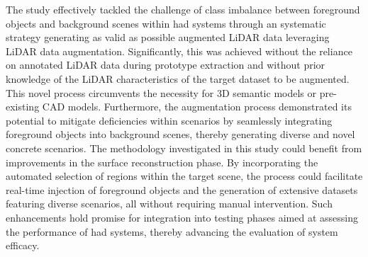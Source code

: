 The study effectively tackled the challenge of class imbalance between foreground objects and background scenes within \acrfull{had} systems through an systematic strategy generating as valid as possible augmented LiDAR data leveraging LiDAR data augmentation. Significantly, this was achieved without the reliance on annotated LiDAR data during prototype extraction and without prior knowledge of the LiDAR characteristics of the target dataset to be augmented. This novel process circumvents the necessity for 3D semantic models or pre-existing CAD models. Furthermore, the augmentation process demonstrated its potential to mitigate deficiencies within scenarios by seamlessly integrating foreground objects into background scenes, thereby generating diverse and novel concrete scenarios. 
The methodology investigated in this study could benefit from improvements in the surface reconstruction phase. By incorporating the automated selection of regions within the target scene, the process could facilitate real-time injection of foreground objects and the generation of extensive datasets featuring diverse scenarios, all without requiring manual intervention. Such enhancements hold promise for integration into testing phases aimed at assessing the performance of \acrfull{had} systems, thereby advancing the evaluation of system efficacy.

